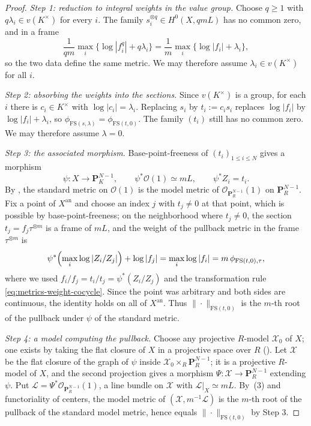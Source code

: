 \begin{proof}
\emph{Step 1: reduction to integral weights in the value group.} Choose
$q\ge1$ with $q\lambda_i\in v(K^\times)$ for every $i$. The family
$s_i^{\otimes q}\in H^0(X,qmL)$ has no common zero, and in a frame
\[
 \frac1{qm}\max_i\bigl\{\log|f_i^q|+q\lambda_i\bigr\}
 =\frac1m\max_i\bigl\{\log|f_i|+\lambda_i\bigr\},
\]
so the two data define the same metric. We may therefore assume
$\lambda_i\in v(K^\times)$ for all $i$.

\emph{Step 2: absorbing the weights into the sections.} Since
$v(K^\times)$ is a group, for each $i$ there is $c_i\in K^\times$ with
$\log|c_i|=\lambda_i$. Replacing $s_i$ by $t_i:=c_is_i$ replaces
$\log|f_i|$ by $\log|f_i|+\lambda_i$, so
$\phi_{\mathrm{FS}(s,\lambda)}=\phi_{\mathrm{FS}(t,0)}$. The family
$(t_i)$ still has no common zero. We may therefore assume
$\lambda=0$.

\emph{Step 3: the associated morphism.} Base-point-freeness of
$(t_i)_{1\le i\le N}$ gives a morphism
\[
 \psi:X\longrightarrow\mathbf P^{N-1}_K,
 \qquad \psi^*\mathcal O(1)\simeq mL,\qquad \psi^*Z_i=t_i .
\]
By , the standard metric on
$\mathcal O(1)$ is the model metric of
$\mathcal O_{\mathbf P^{N-1}_R}(1)$ on $\mathbf P^{N-1}_R$. Fix a point
of $X^{\mathrm{an}}$ and choose an index $j$ with $t_j\ne0$ at that
point, which is possible by base-point-freeness; on the neighborhood where
$t_j\ne0$, the section $t_j=f_j\tau^{\otimes m}$ is a frame of $mL$,
and the weight of the pullback metric in the frame $\tau^{\otimes m}$ is
\[
 \psi^*\Bigl(\max_i\log|Z_i/Z_j|\Bigr)+\log|f_j|
 =\max_i\log|f_i|=m\,\phi_{\mathrm{FS}(t,0),\tau},
\]
where we used $f_i/f_j=t_i/t_j=\psi^*(Z_i/Z_j)$ and the transformation
rule \eqref{eq:metrics-weight-cocycle}. Since the point was arbitrary and
both sides are continuous, the identity holds on all of
$X^{\mathrm{an}}$. Thus
$\|\cdot\|_{\mathrm{FS}(t,0)}$ is the $m$-th root of the pullback under
$\psi$ of the standard metric.

\emph{Step 4: a model computing the pullback.} Choose any projective
$R$-model $\mathcal X_0$ of $X$; one exists by taking the flat closure
of $X$ in a projective space over $R$
(). Let $\mathcal X$ be the flat
closure of the graph of $\psi$ inside
$\mathcal X_0\times_R\mathbf P^{N-1}_R$; it is a projective $R$-model of
$X$, and the second projection gives a morphism
$\Psi:\mathcal X\to\mathbf P^{N-1}_R$ extending $\psi$. Put
$\mathcal L=\Psi^*\mathcal O_{\mathbf P^{N-1}_R}(1)$, a line bundle on
$\mathcal X$ with $\mathcal L|_X\simeq mL$. By
\,(3) and functoriality of centers, the
model metric of $(\mathcal X,m^{-1}\mathcal L)$ is the $m$-th root of the
pullback of the standard model metric, hence equals
$\|\cdot\|_{\mathrm{FS}(t,0)}$ by Step 3.


\end{proof}
